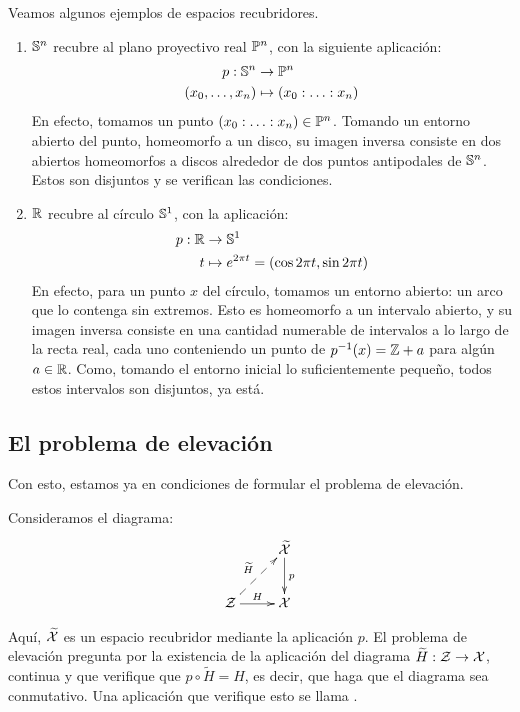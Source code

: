 \begin{exa}[Recubrimientos]
	\label{grf_exa_recubrimientos}
	Veamos algunos ejemplos de espacios recubridores.
	
	\begin{enumerate}
		\item $\mathbb{S}^n$ recubre al plano proyectivo real $\mathbb{P}^n$, con la siguiente aplicación:
		\[\begin{split}
		p:\mathbb{S}^n&\to\mathbb{P}^n \\
		(x_0,\dots,x_n)&\mapsto (x_0:\dotsc:x_n)
		\end{split}\]
		En efecto, tomamos un punto $(x_0:\dotsc:x_n)\in\mathbb{P}^n$. Tomando un entorno abierto del punto, homeomorfo a un disco, su imagen inversa consiste en dos abiertos homeomorfos a discos alrededor de dos puntos antipodales de $\mathbb{S}^n$. Estos son disjuntos y se verifican las condiciones.
		
		\item $\mathbb{R}$ recubre al círculo $\mathbb{S}^1$, con la aplicación:
		\[\begin{split}
		p:\mathbb{R}&\to\mathbb{S}^1 \\
		t &\mapsto e^{2\pi t}=(\cos 2\pi t,\sin 2\pi t)
		\end{split}\]
		En efecto, para un punto $x$ del círculo, tomamos un entorno abierto: un arco que lo contenga sin extremos. Esto es homeomorfo a un intervalo abierto, y su imagen inversa consiste en una cantidad numerable de intervalos a lo largo de la recta real, cada uno conteniendo un punto de $p^{-1}(x) = \mathbb{Z} + a$ para algún $a\in\mathbb{R}$. Como, tomando el entorno inicial lo suficientemente pequeño, todos estos intervalos son disjuntos, ya está. \qedhere
	\end{enumerate}
\end{exa}

\subsection{El problema de elevación}

Con esto, estamos ya en condiciones de formular el problema de elevación.

\begin{const}
	Consideramos el diagrama:
	\[\xymatrix{
		& \widetilde{\X} \ar[d]^p \\
		\mc{Z} \ar@{-->}[ru]^{\widetilde{H}} \ar[r]^H & \X
	}\]
	
	Aquí, $\widetilde{\mathcal{X}}$ es un espacio recubridor mediante la aplicación $p$. El problema de elevación pregunta por la existencia de la aplicación del diagrama $\widetilde{H}:\mathcal{Z}\to\mathcal{X}$, continua y que verifique que $p\circ\widetilde{H}=H$, es decir, que haga que el diagrama sea conmutativo. Una aplicación que verifique esto se llama .
\end{const}

